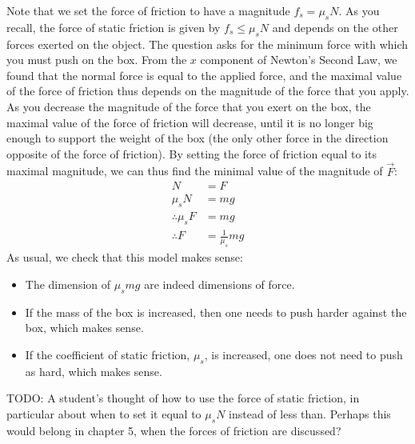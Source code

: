 \begin{example}
Note that we set the force of friction to have a magnitude $f_s = \mu_s N$. As you recall, the force of static friction is given by $f_s \leq \mu_s N$ and depends on the other forces exerted on the object. The question asks for the minimum force with which you must push on the box. From the $x$ component of Newton's Second Law, we found that the normal force is equal to the applied force, and the maximal value of the force of friction thus depends on the magnitude of the force that you apply. As you decrease the magnitude of the force that you exert on the box, the maximal value of the force of friction will decrease, until it is no longer big enough to support the weight of the box (the only other force in the direction opposite of the force of friction). By setting the force of friction equal to its maximal magnitude, we can thus find the minimal value of the magnitude of $\vec F$:
\begin{align*}
N&=F\\
\mu_sN &= mg\\
\therefore \mu_s F &= mg\\
\therefore F &= \frac{1}{\mu_s}mg
\end{align*}
As usual, we check that this model makes sense:
\begin{itemize}
\item The dimension of $\mu_s mg$ are indeed dimensions of force.
\item If the mass of the box is increased, then one needs to push harder against the box, which makes sense.
\item If the coefficient of static friction, $\mu_s$, is increased, one does not need to push as hard, which makes sense. 
\end{itemize}
\end{example}

TODO: A student's thought of how to use the force of static friction, in particular about when to set it equal to $\mu_sN$ instead of less than. Perhaps this would belong in chapter 5, when the forces of friction are discussed?



